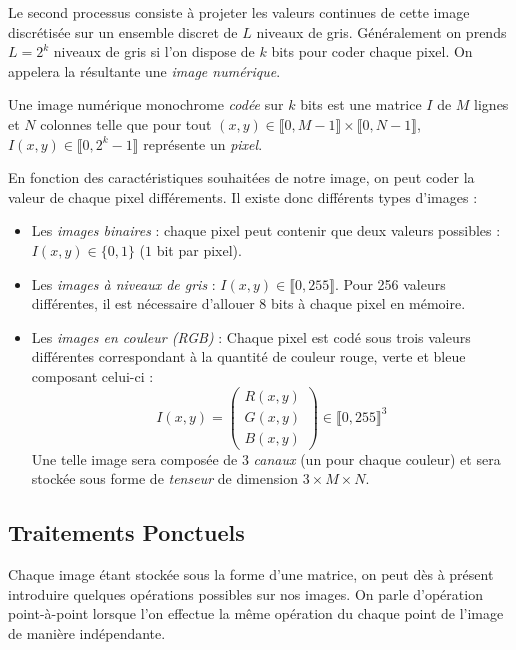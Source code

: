 Le second processus consiste à projeter les valeurs continues de cette image discrétisée sur un ensemble discret de $L$ niveaux de gris. Généralement on prends $L = 2^k$ niveaux de gris si l'on dispose de $k$ bits pour coder chaque pixel. On appelera la résultante une \emph{image numérique}. 

\begin{definition}
    Une image numérique monochrome \emph{codée} sur $k$ bits est une matrice $I$ de $M$ lignes et $N$ colonnes telle que pour tout $ (x,y) \in  \llbracket 0, M-1 \rrbracket \times \llbracket 0, N-1 \rrbracket$, $I(x,y) \in \llbracket 0, 2^k -1 \rrbracket$ représente un \emph{pixel}. 
\end{definition}

En fonction des caractéristiques souhaitées de notre image, on peut coder la valeur de chaque pixel différements. Il existe donc différents types d'images : 
\begin{itemize}
    \item Les \emph{images binaires} : chaque pixel peut contenir que deux valeurs possibles : $I(x,y) \in \{0, 1\}$ ($1$ bit par pixel).
    \item Les \emph{images à niveaux de gris} : $I(x,y) \in \llbracket 0, 255 \rrbracket$. Pour 256 valeurs différentes, il est nécessaire d'allouer 8 bits à chaque pixel en mémoire. 
    \item Les \emph{images en couleur (RGB)} : Chaque pixel est codé sous trois valeurs différentes correspondant à la quantité de couleur rouge, verte et bleue composant celui-ci :
    $$ I(x,y) = \begin{pmatrix} R(x,y) \\ G(x,y) \\ B(x,y) \end{pmatrix} \in \llbracket 0, 255 \rrbracket^3 $$
    Une telle image sera composée de 3 \emph{canaux} (un pour chaque couleur) et sera stockée sous forme de \emph{tenseur} de dimension $ 3 \times M \times N$. 
\end{itemize}

\subsection{Traitements Ponctuels}

Chaque image étant stockée sous la forme d'une matrice, on peut dès à présent introduire quelques opérations possibles sur nos images. On parle d'opération point-à-point lorsque l'on effectue la même opération du chaque point de l'image de manière indépendante. 

